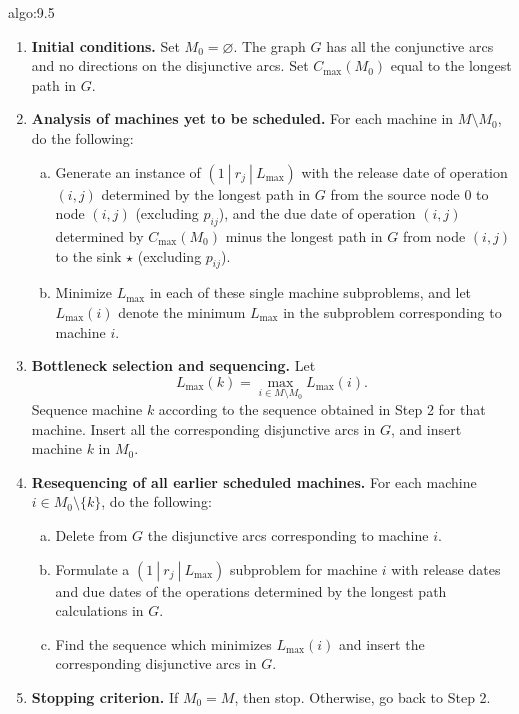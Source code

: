 \begin{algo}{algo:9.5}
    \begin{enumerate}
        \item {\bf Initial conditions.} Set $M_0 = \varnothing$. The graph $G$ 
        has all the conjunctive arcs and no directions on the disjunctive arcs. 
        Set $C_{\max}(M_0)$ equal to the longest path in $G$. 

        \item {\bf Analysis of machines yet to be scheduled.} For each 
        machine in $M \setminus M_0$, do the following: 
        \begin{enumerate}[(a)]
            \item Generate an instance of $(1~|~r_j~|~L_{\max})$ with the 
            release date of operation $(i, j)$ determined by the longest 
            path in $G$ from the source node $0$ to node $(i, j)$ 
            (excluding $p_{ij}$), and the due date of operation $(i, j)$ 
            determined by $C_{\max}(M_0)$ minus the longest path in $G$ 
            from node $(i, j)$ to the sink $\star$ (excluding $p_{ij}$).
            \item Minimize $L_{\max}$ in each of these single machine 
            subproblems, and let $L_{\max}(i)$ denote the minimum 
            $L_{\max}$ in the subproblem corresponding to machine $i$. 
        \end{enumerate}

        \item {\bf Bottleneck selection and sequencing.} Let 
        \[ L_{\max}(k) = \max_{i \in M \setminus M_0} L_{\max}(i). \] 
        Sequence machine $k$ according to the sequence obtained in Step 2 
        for that machine. Insert all the corresponding disjunctive arcs 
        in $G$, and insert machine $k$ in $M_0$. 

        \item {\bf Resequencing of all earlier scheduled machines.} 
        For each machine $i \in M_0 \setminus \{k\}$, do the following: 
        \begin{enumerate}[(a)]
            \item Delete from $G$ the disjunctive arcs corresponding to machine $i$. 
            \item Formulate a $(1~|~r_j~|~L_{\max})$ subproblem for machine $i$ 
            with release dates and due dates of the operations determined by the 
            longest path calculations in $G$.
            \item Find the sequence which minimizes $L_{\max}(i)$ and insert the 
            corresponding disjunctive arcs in $G$. 
        \end{enumerate}

        \item {\bf Stopping criterion.} If $M_0 = M$, then stop. Otherwise, go back 
        to Step 2. 
    \end{enumerate}
\end{algo}

